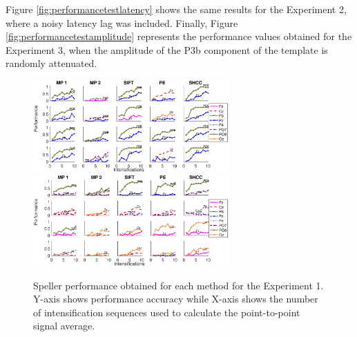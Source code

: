 \documentclass[brainsci,article,submit,moreauthors,pdftex,10pt,a4paper]{mdpi}
\begin{document}


Figure \ref{fig:performancetestlatency} shows the same results for the Experiment 2, where a noisy latency lag was included.   Finally, Figure \ref{fig:performancetestamplitude} represents the performance values obtained for the Experiment 3, when the amplitude of the P3b component of the template is randomly attenuated.  

\begin{figure}[H]
\centering
\includegraphics[width=7.5cm]{images/1-1.eps}
\includegraphics[width=7.5cm]{images/2-1.eps}
\caption{Speller performance obtained for each method for the Experiment 1.  Y-axis shows performance accuracy while X-axis shows the number of intensification sequences used to calculate the point-to-point signal average.}
\label{fig:performancetest}
\end{figure}
\end{document}
